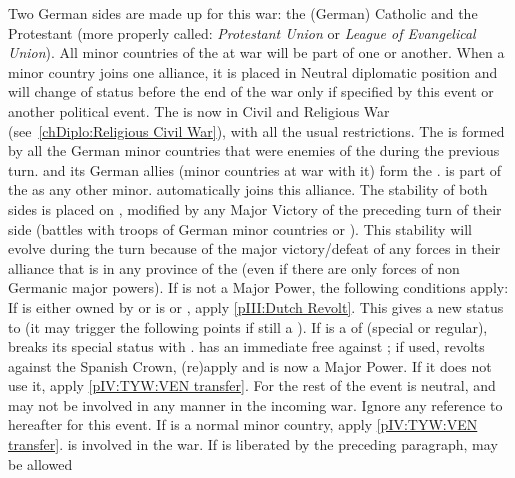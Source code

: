 \phevnt
\begin{digressions}


  \aparag Two German sides are made up for this war: the (German) Catholic
  \ligue and the Protestant \alliance (more properly called: \emph{Protestant
    Union} or \emph{League of Evangelical Union}).  All minor countries of the
  \HRE at war will be part of one or another. When a minor country joins one
  alliance, it is placed in Neutral diplomatic position and will change of
  status before the end of the war only if specified by this event or another
  political event. The \HRE is now in Civil and Religious War
  (see~\ref{chDiplo:Religious Civil War}), with all the usual restrictions.
  \bparag The \alliance is formed by all the German minor countries that were
  enemies of the \HAB during the previous turn.
  \bparag \HAB and its German allies (minor countries at war with it) form the
  \ligue. \AUSMin is part of the \ligue as any other minor. \paysBaviere
  automatically joins this alliance.
  \bparag The stability of both sides is placed on , modified by any
  Major Victory of the preceding turn of their side (battles with troops of
  German minor countries or \HAB).  This stability will evolve during the turn
  because of the major victory/defeat of any forces in their alliance that is
  in any province of the \HRE (even if there are only forces of non Germanic
  major powers).
   If \HOL is not a Major Power, the
  following conditions apply:
  \bparag If \payshollande is either owned by \SPA or is \paysprovincesne or
  \paysVhollande, apply \ref{pIII:Dutch Revolt}. This gives a new status to
  \payshollande (it may trigger the following points if still a \MIN).
  \bparag If \payshollande is a \VASSAL of \SPA (special or regular),
  \payshollande breaks its special status with \SPA. \SPA has an immediate
  free \CB against \payshollande ; if used, \payshollande revolts against the
  Spanish Crown, (re)apply  and \HOL is now a
  Major Power. If it does not use it, apply \ref{pIV:TYW:VEN transfer}. For
  the rest of the event \HOLhol is neutral, and may not be involved in any
  manner in the incoming war. Ignore any reference to \HOLhol hereafter for
  this event.
  \bparag If \payshollande is a normal minor country, apply \ref{pIV:TYW:VEN
    transfer}. \HOLhol is involved in the war.
  \label{pIV:TYW:VEN transfer} If
  \payshollande is liberated by the preceding paragraph, \VEN may be allowed

\end{digressions}
